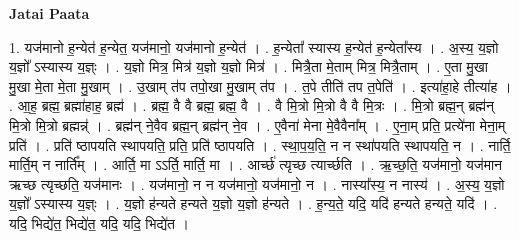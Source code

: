 \documentclass[17pt]{extarticle}
\begin{document}
\textbf{Jatai Paata} \newline

1. यज॑मानो ह॒न्येत॑ ह॒न्येत॒ यज॑मानो॒ यज॑मानो ह॒न्येत॑ । . ह॒न्येता᳚ स्यास्य ह॒न्येत॑ ह॒न्येता᳚स्य । . अ॒स्य॒ य॒ज्ञो य॒ज्ञो᳚ ऽस्यास्य य॒ज्ञ्ः । . य॒ज्ञो मित्र॒ मित्र॑ य॒ज्ञो य॒ज्ञो मित्र॑ । . मित्रै॒ता मे॒ताम् मित्र॒ मित्रै॒ताम् । . ए॒ता मु॒खा मु॒खा मे॒ता मे॒ता मु॒खाम् । . उ॒खाम् त॑प तपो॒खा मु॒खाम् त॑प । . त॒पे तीति॑ तप त॒पेति॑ । . इत्या॑हा॒हे तीत्या॑ह । . आ॒ह॒ ब्रह्म॒ ब्रह्मा॑हाह॒ ब्रह्म॑ । . ब्रह्म॒ वै वै ब्रह्म॒ ब्रह्म॒ वै । . वै मि॒त्रो मि॒त्रो वै वै मि॒त्रः । . मि॒त्रो ब्रह्म॒न् ब्रह्म॑न् मि॒त्रो मि॒त्रो ब्रह्मन्न्॑ । . ब्रह्म॑न् ने॒वैव ब्रह्म॒न् ब्रह्म॑न् ने॒व । . ए॒वैना॑ मेना मे॒वैवैना᳚म् । . ए॒ना॒म् प्रति॒ प्रत्ये॑ना मेना॒म् प्रति॑ । . प्रति॑ ष्ठापयति स्थापयति॒ प्रति॒ प्रति॑ ष्ठापयति । . स्था॒प॒य॒ति॒ न न स्था॑पयति स्थापयति॒ न । . नार्ति॒ मार्ति॒म् न नार्ति᳚म् । . आर्ति॒ मा ऽऽर्ति॒ मार्ति॒ मा । . आर्च्छ॑ त्यृच्छ त्यार्च्छति । . ऋ॒च्छ॒ति॒ यज॑मानो॒ यज॑मान ऋच्छ त्यृच्छति॒ यज॑मानः । . यज॑मानो॒ न न यज॑मानो॒ यज॑मानो॒ न । . नास्या᳚स्य॒ न नास्य॑ । . अ॒स्य॒ य॒ज्ञो य॒ज्ञो᳚ ऽस्यास्य य॒ज्ञ्ः । . य॒ज्ञो ह॑न्यते हन्यते य॒ज्ञो य॒ज्ञो ह॑न्यते । . ह॒न्य॒ते॒ यदि॒ यदि॑ हन्यते हन्यते॒ यदि॑ । . यदि॒ भिद्ये॑त॒ भिद्ये॑त॒ यदि॒ यदि॒ भिद्ये॑त । \newline
\end{document}
